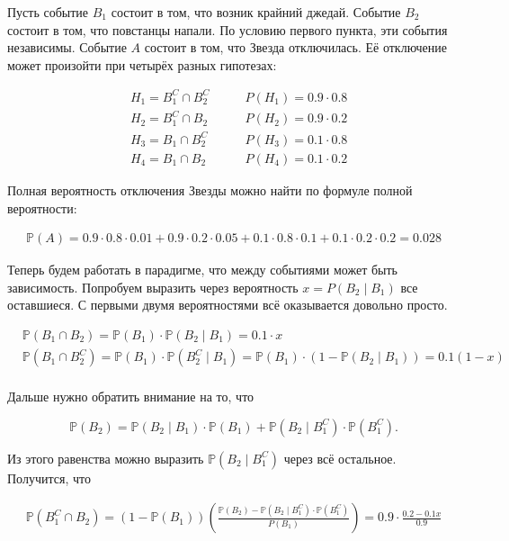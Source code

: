 \documentclass[12pt, a4paper, oneside]{extreport}
\def \mbb{\mathbb}
\def \PP{\mbb{P}}
\theoremstyle{plain}              %
\theoremstyle{definition}         %
\begin{document}
\begin{sol}
Пусть событие $B_1$ состоит в том, что возник крайний джедай. Событие $B_2$ состоит в том, что повстанцы напали. По условию первого пункта, эти события независимы. Событие $A$ состоит в том, что Звезда отключилась. Её отключение может произойти при четырёх разных гипотезах: 

\begin{equation*}
\begin{aligned}
&H_1 = B_1^{C} \cap B_2^{C} \qquad &P(H_1) = 0.9 \cdot 0.8 \\
&H_2 = B_1^{C}  \cap  B_2 \qquad &P(H_2) = 0.9 \cdot 0.2 \\
&H_3 = B_1 \cap B_2^{C}\qquad &P(H_3) = 0.1 \cdot 0.8 \\ 
&H_4 = B_1 \cap B_2 \qquad &P(H_4) = 0.1 \cdot 0.2 
\end{aligned}
\end{equation*}

Полная вероятность отключения Звезды можно найти по формуле полной вероятности: 

\begin{multline*}
\PP(A) = 0.9 \cdot 0.8 \cdot 0.01 + 0.9 \cdot 0.2 \cdot 0.05 + 0.1 \cdot 0.8 \cdot 0.1 + 0.1 \cdot 0.2 \cdot 0.2 = 0.028
\end{multline*}

Теперь будем работать в парадигме, что между событиями может быть зависимость. Попробуем выразить через вероятность $x = P(B_2 \mid B_1)$ все оставшиеся.  С первыми двумя вероятностями всё оказывается довольно просто.

\begin{equation*} 
\begin{aligned}
&\PP(B_1 \cap B_2) = \PP(B_1) \cdot \PP(B_2 \mid B_1) = 0.1 \cdot x \\
&\PP(B_1 \cap B_2^C) = \PP(B_1) \cdot \PP(B_2^{C} \mid B_1) = \PP(B_1) \cdot (1 - \PP(B_2 \mid B_1)) = 0.1 (1-x) \\
\end{aligned}
\end{equation*}

Дальше нужно обратить внимание на то, что 

\[ \PP(B_2) = \PP(B_2 \mid B_1) \cdot \PP(B_1) + \PP(B_2 \mid B_1^C) \cdot \PP(B_1^C). \]

Из этого равенства можно выразить $\PP(B_2 \mid B_1^C) $  через всё остальное. Получится, что 
		
\begin{multline*}
\PP(B_1^C \cap B_2) = (1 - \PP(B_1))(\frac{\PP(B_2) - \PP(B_2 \mid B_1^C) \cdot \PP(B_1^C)}{P(B_1)} ) = 0.9 \cdot \frac{0.2 - 0.1 x}{0.9}
\end{multline*}


\end{sol}
\end{document}
